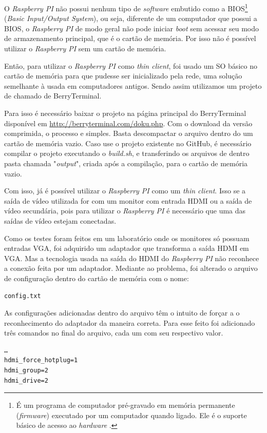 \documentclass[
	12pt,				%
	openright,			%
	twoside,			%
	a4paper,			%
	chapter=TITLE,		%
	english,			%
	brazil				%
	]{abntex2}
\begin{document}
O \textit{Raspberry PI} não possui nenhum tipo de \textit{software} embutido como a BIOS\footnote{É um programa de computador pré-gravado em memória permanente (\textit{firmware}) executado por um computador quando ligado. Ele é o suporte básico de acesso ao \textit{hardware} \cite{bios}.} (\textit{Basic Input/Output System}), ou seja, diferente de um computador que possui a BIOS, o \textit{Raspberry PI} de modo geral não pode iniciar \textit{boot} sem acessar seu modo de armazenamento principal, que é o cartão de memória. Por isso não é possível utilizar o \textit{Raspberry PI} sem um cartão de memória.

Então, para utilizar o \textit{Raspberry PI} como \textit{thin client}, foi usado um SO básico no cartão de memória para que pudesse ser inicializado pela rede, uma solução semelhante à usada em computadores antigos. Sendo assim utilizamos um projeto de chamado de BerryTerminal. 
	
Para isso é necessário baixar o projeto na página principal do BerryTerminal  disponível em \url{http://berryterminal.com/doku.php}. Com o download da versão comprimida, o processo e simples. Basta descompactar o arquivo dentro do um cartão de memória vazio. Caso use o projeto existente no GitHub, é necessário compilar o projeto executando o \textit{build.sh}, e transferindo os arquivos de dentro pasta chamada "\textit{output}", criada após a compilação, para o cartão de memória vazio.

Com isso, já é possível utilizar o \textit{Raspberry PI} como um \textit{thin client}. Isso se a saída de vídeo utilizada for com um monitor com entrada HDMI ou a saída de vídeo secundária, pois para utilizar o \textit{Raspberry PI} é necessário que uma das saídas de vídeo estejam conectadas.

Como os testes foram feitos em um laboratório onde os monitores só possuam entradas VGA, foi adquirido um adaptador que transforma a saída HDMI em VGA. Mas a tecnologia usada na saída do HDMI do \textit{Raspberry PI} não reconhece a conexão feita por um adaptador. Mediante ao problema, foi alterado o arquivo de configuração dentro do cartão de memória com o nome:
\begin{verbatim}
config.txt
\end{verbatim}

As configurações adicionadas dentro do arquivo têm o intuito de forçar a o reconhecimento do adaptador da maneira correta. Para esse feito foi adicionado três comandos no final do arquivo, cada um com seu respectivo valor. 
\begin{verbatim}
…
hdmi_force_hotplug=1
hdmi_group=2
hdmi_drive=2
\end{verbatim}
\end{document}
